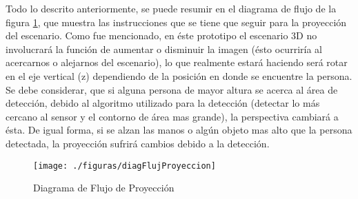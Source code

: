 \documentclass[a4paper,openright,12pt]{report}
\begin{document}
\vspace*{5mm}
Todo lo descrito anteriormente, se puede resumir en el diagrama de flujo de la figura \ref{fig:diagFlujProyeccion}, que muestra las instrucciones que se tiene que seguir para la proyección del escenario. Como fue mencionado, en éste prototipo el escenario 3D no involucrará la función de aumentar o disminuir la imagen (ésto ocurriría al acercarnos o alejarnos del escenario), lo que realmente estará haciendo será rotar en el eje vertical (z) dependiendo de la posición en donde se encuentre la persona.\\
Se debe considerar, que si alguna persona de mayor altura se acerca al área de detección, debido al algoritmo utilizado para la detección (detectar lo más cercano al sensor y el contorno de área mas grande), la perspectiva cambiará a ésta. De igual forma, si se alzan las manos o algún objeto mas alto que la persona detectada, la proyección sufrirá cambios debido a la detección.
\begin{figure}[thb]
	\centering
	\texttt{[image: ./figuras/diagFlujProyeccion]}
	\caption{Diagrama de Flujo de Proyección} \label{fig:diagFlujProyeccion}
\end{figure}
\begin{comment}
\begin{algorithm}[tbh]
	\SetAlgoLined
	\KwData{Imagen Depth, Imagen RGB, class Persona	}
	\KwResult{Calcular posición de la persona en imagen Depth}
	Obtener contorno de la class Persona\;
	Calcular centro del contorno usando Momentos\;
	Calcular distancia entre posición anterior y actual\;
	\If{distancia $<$ 5}{
		posición actual = posición anterior
	}
	Guardar posición actual en class Persona\;
	Mostrar imagen RGB con punto central\;
	\caption{Posición de la Persona}
	\label{alg:posicion}
\end{algorithm}
\end{comment}

\begin{comment}
\begin{algorithm}[tbh]
	\SetAlgoLined
	\KwIn{Posición persona (x,y)}
	\KwData{Punto Central $\rightarrow$ (-35.0, 24.0, 0.0)}
	\KwResult{Posicionar cámara virtual respecto a posición de la persona, enfocando a punto central}
	Obtener Posición de la persona\;
	Posición cámara $\rightarrow$ Posición persona $/$ 10\;
	
	\If{Posición cámara $!=$ Posición cámara anterior}{
		Calcular ángulo z entre Posición cámara y Punto Central\;
		Rotar cámara en el ángulo z calculado\;
		Rotar ventana de cámara\;
	}
	Ubicar cámara en la Posición cámara\;
	\caption{proyección de la Persona}
\end{algorithm}
\end{comment}
\end{document}
